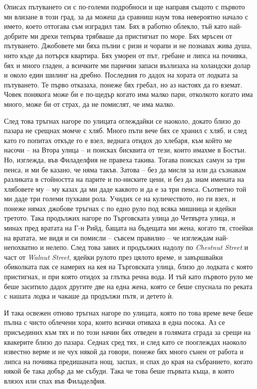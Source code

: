 \documentclass[12pt]{book}
\begin{document}
Описах пътуването си с по-големи подробноси и ще направя същото с първото ми влизане в този град, за да можеш да сравниш наум това невероятно начало с името, което оттогава съм изградил там. Бях в работно облекло, тъй като най-добрите ми дрехи тепърва трябваше да пристигнат по море. Бях мръсен от пътуването. Джобовете ми бяха пълни с ризи и чорапи и не познавах жива душа, нито къде да потърся квартира. Бях уморен от път, гребане и липса на почивка, бях и много гладен, а всичките ми парични запаси възлизаха на холандски долар и около един шилинг на дребно. Последния го дадох на хората от лодката за пътуването. Те първо отказаха, понеже бях гребал, но аз настоях да го вземат. Човек понякога може би е по-щедър когато има малко пари, отколкото когато има много, може би от страх, да не помислят, че има малко.

След това тръгнах нагоре по улицата оглеждайки се наоколо, докато близо до пазара не срещнах момче с хляб. Много пъти вече бях се хранил с хляб, и след като го попитах откъде го е взел, веднага отидох до хлебаря, към който ме насочи – на Втора улица  – и поисках бисквита от тези, които имахме в Бостън. Но, изглежда, във Филаделфия не правеха такива. Тогава поисках самун за три пенса, и ми бе казано, че няма такъв. Затова – без да мисля за или да съзнавам разликата в стойността на парите и по-ниските цени, и без да знам имената на хлябовете му – му казах да ми даде каквото и да е за три пенса. Съответно той ми даде три големи пухкави рола. Учидих се на куличеството, но ги взех, и понеже нямах джобове тръгнах с по едно руло под всяка мишница и ядейки третото. Така продължих нагоре по Търговската улица до Четвърта улица, и минах пред вратата на Г-н Рийд, бащата на бъдещата ми жена, когато тя, стоейки на вратата, ме видя и си помисли – съвсем правилно – че изглеждам най-непохватно и нелепо. След това завих и продължих надолу по \textit{Chestnut Street} и част от \textit{Walnut Street}, ядейки рулото през цялото време, и завършвайки обиколката пак се намерих на кея на Търговската улица, близо до лодката с която пристигнах, и при която отидох за глътка речна вода. И тъй като първото руло ме беше заситило дадох другите две на една жена, която се беше спуснала по реката с нашата лодка и чакаше да продължи пътя, и детето ѝ.

И така освежен отново тръгнах нагоре по улицата, която по това време вече беше пълна с чисто облечени хора, които всички отиваха в една посока. Аз се присъединих към тях и по този начин бях отведен в голямата сграда за срещи на квакерите близо до пазара. Седнах сред тях, и след като се пооглеждах наоколо известно верме и не чух някой да говори, понеже бях много сънен от работа и липса на почивка предишаната нощ, заспах, и спах до края на събранието, когато някой бе така добър да ме събуди. Така че това беше първата къща, в която влязох или спах във Филаделфия.  
\end{document}
